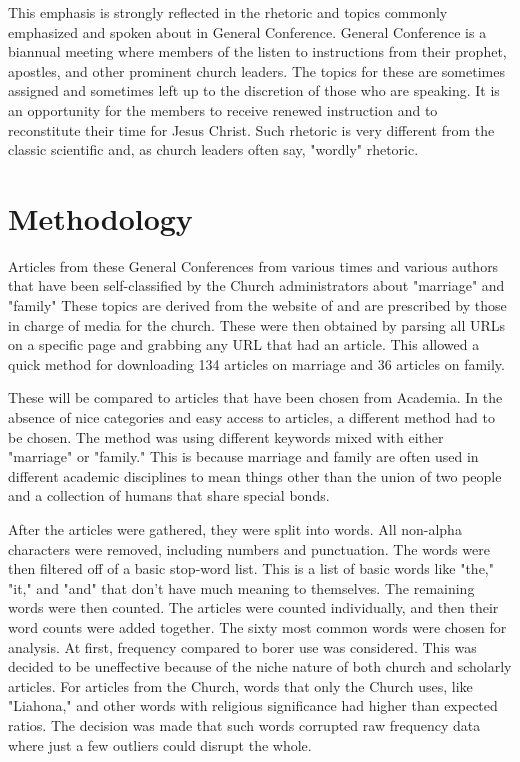 \documentclass[twocolumn]{article}
\begin{document}
This emphasis is strongly reflected in the rhetoric and topics commonly emphasized and spoken about in General Conference. General Conference is a biannual meeting where members of the \church listen to instructions from their prophet, apostles, and other prominent church leaders. The topics for these are sometimes assigned and sometimes left up to the discretion of those who are speaking. It is an opportunity for the members to receive renewed instruction and to reconstitute their time for Jesus Christ. Such rhetoric is very different from the classic scientific and, as church leaders often say, "wordly" rhetoric.
\section{Methodology}
Articles from these General Conferences from various times and various authors that have been self-classified by the Church administrators about "marriage" and "family" These topics are derived from the website of \church and are prescribed by those in charge of media for the church. These were then obtained by parsing all URLs on a specific page and grabbing any URL that had an article. This allowed a quick method for downloading 134 articles on marriage and 36 articles on family.

These will be compared to articles that have been chosen from Academia. In the absence of nice categories and easy access to articles, a different method had to be chosen. The method was using different keywords mixed with either "marriage" or "family." This is because marriage and family are often used in different academic disciplines to mean things other than the union of two people and a collection of humans that share special bonds.

After the articles were gathered, they were split into words. All non-alpha characters were removed, including numbers and punctuation. The words were then filtered off of a basic stop-word list. This is a list of basic words like "the," "it," and "and" that don't have much meaning to themselves. The remaining words were then counted. The articles were counted individually, and then their word counts were added together. The sixty most common words were chosen for analysis. At first, frequency compared to borer use was considered. This was decided to be uneffective because of the niche nature of both church and scholarly articles. For articles from the Church, words that only the Church uses, like "Liahona," and other words with religious significance had higher than expected ratios. The decision was made that such words corrupted raw frequency data where just a few outliers could disrupt the whole.
\end{document}
